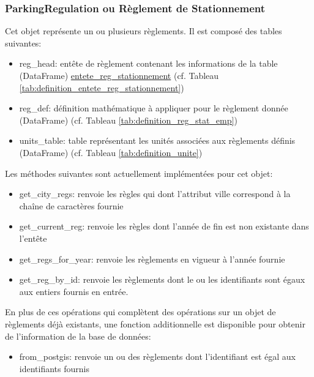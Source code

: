         \subsubsection{ParkingRegulation ou Règlement de Stationnement} Cet objet représente un ou plusieurs règlements. Il est composé des tables suivantes:
        \begin{itemize}
            \item reg\_head: entête de règlement contenant les informations de la table (DataFrame) \underline{entete\_reg\_stationnement} (cf. Tableau \ref{tab:definition_entete_reg_stationnement})
            \item reg\_def: définition mathématique à appliquer pour le règlement donnée (DataFrame) (cf. Tableau \ref{tab:definition_reg_stat_emp})
            \item units\_table: table représentant les unités associées aux règlements définis (DataFrame) (cf. Tableau \ref{tab:definition_unite})
        \end{itemize}
        Les méthodes suivantes sont actuellement implémentées pour cet objet:
        \begin{itemize}
            \item get\_city\_regs: renvoie les règles qui dont l'attribut ville correspond à la chaîne de caractères fournie
            \item get\_current\_reg: renvoie les règles dont l'année de fin est non existante dans l'entête
            \item get\_regs\_for\_year: renvoie les règlements en vigueur à l'année fournie
            \item get\_reg\_by\_id: renvoie les règlements dont le ou les identifiants sont égaux aux entiers fournis en entrée.
        \end{itemize}
        En plus de ces opérations qui complètent des opérations sur un objet de règlements déjà existants, une fonction additionnelle est disponible pour obtenir de l'information de la base de données:
        \begin{itemize}
            \item from\_postgis: renvoie un ou des règlements dont l'identifiant est égal aux identifiants fournis
        \end{itemize}
        

